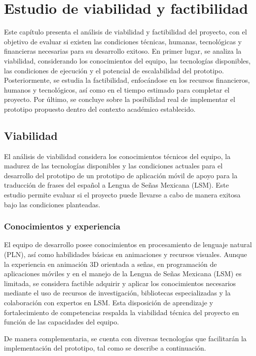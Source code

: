 \chapter{Estudio de viabilidad y factibilidad}

Este capítulo presenta el análisis de viabilidad y factibilidad del proyecto, con el objetivo de evaluar si existen las condiciones técnicas, humanas, tecnológicas y financieras necesarias para su desarrollo exitoso. En primer lugar, se analiza la viabilidad, considerando los conocimientos del equipo, las tecnologías disponibles, las condiciones de ejecución y el potencial de escalabilidad del prototipo. Posteriormente, se estudia la factibilidad, enfocándose en los recursos financieros, humanos y tecnológicos, así como en el tiempo estimado para completar el proyecto. Por último, se concluye sobre la posibilidad real de implementar el prototipo propuesto dentro del contexto académico establecido.\\

\section{Viabilidad}
El análisis de viabilidad considera los conocimientos técnicos del equipo, la madurez de las tecnologías disponibles y las condiciones actuales para el desarrollo del prototipo de un prototipo de aplicación móvil de apoyo para la traducción de frases del español a Lengua de Señas Mexicana (LSM). Este estudio permite evaluar si el proyecto puede llevarse a cabo de manera exitosa bajo las condiciones planteadas.

\subsection{Conocimientos y experiencia}
El equipo de desarrollo posee conocimientos en procesamiento de lenguaje natural (PLN), así como habilidades básicas en animaciones y recursos visuales. Aunque la experiencia en animación 3D orientada a señas, en programación de aplicaciones móviles y en el manejo de la Lengua de Señas Mexicana (LSM) es limitada, se considera factible adquirir y aplicar los conocimientos necesarios mediante el uso de recursos de investigación, bibliotecas especializadas y la colaboración con expertos en LSM. Esta disposición de aprendizaje y fortalecimiento de competencias respalda la viabilidad técnica del proyecto en función de las capacidades del equipo.

De manera complementaria, se cuenta con diversas tecnologías que facilitarán la implementación del prototipo, tal como se describe a continuación.

